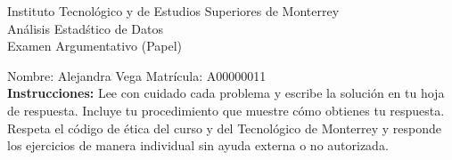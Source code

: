 \documentclass[10pt]{report}
\begin{document}
\newpage



\begin{center}
{\large Instituto Tecnol\'{o}gico y de Estudios Superiores de Monterrey \\
An\'alisis Estad\'stico de Datos } \\
Examen Argumentativo (Papel)
\end{center}

Nombre: \underline{\hspace*{.2in}}
Alejandra Vega
\underline{\hspace*{.2in}} \quad Matr\'icula:\underline{\hspace*{.2in}}
A00000011
\underline{\hspace*{.2in}} \\

{\bf Instrucciones:} Lee con cuidado cada problema y escribe la soluci\'on
en tu hoja de respuesta. Incluye tu procedimiento que muestre c\'omo obtienes tu respuesta.  Respeta el c\'odigo de \'etica del curso y del Tecnol\'ogico de Monterrey y responde los ejercicios de manera individual sin ayuda externa o no autorizada.
\end{document}
